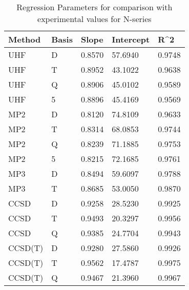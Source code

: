 \begin{table}
  \caption{Regression Parameters for comparison with experimental values for N-series}
  \label{tbl:regression-exp-n}
  \begin{tabular}{l l l l l }
    \hline
    Method & Basis & Slope & Intercept & R^2 \\ 
    \hline
    UHF & D & 0.8570 & 57.6940 & 0.9748 \\ 
    UHF & T & 0.8952 & 43.1022 & 0.9638 \\ 
    UHF & Q & 0.8906 & 45.0102 & 0.9589 \\ 
    UHF & 5 & 0.8896 & 45.4169 & 0.9569 \\ 
    MP2 & D & 0.8120 & 74.8109 & 0.9633 \\ 
    MP2 & T & 0.8314 & 68.0853 & 0.9744 \\ 
    MP2 & Q & 0.8239 & 71.1885 & 0.9753 \\ 
    MP2 & 5 & 0.8215 & 72.1685 & 0.9761 \\ 
    MP3 & D & 0.8494 & 59.6097 & 0.9788 \\ 
    MP3 & T & 0.8685 & 53.0050 & 0.9870 \\ 
    CCSD & D & 0.9258 & 28.5230 & 0.9925 \\ 
    CCSD & T & 0.9493 & 20.3297 & 0.9956 \\ 
    CCSD & Q & 0.9385 & 24.7704 & 0.9943 \\ 
    CCSD(T) & D & 0.9280 & 27.5860 & 0.9926 \\ 
    CCSD(T) & T & 0.9562 & 17.4787 & 0.9975 \\ 
    CCSD(T) & Q & 0.9467 & 21.3960 & 0.9967 \\ 
    \hline
  \end{tabular}
\end{table}
